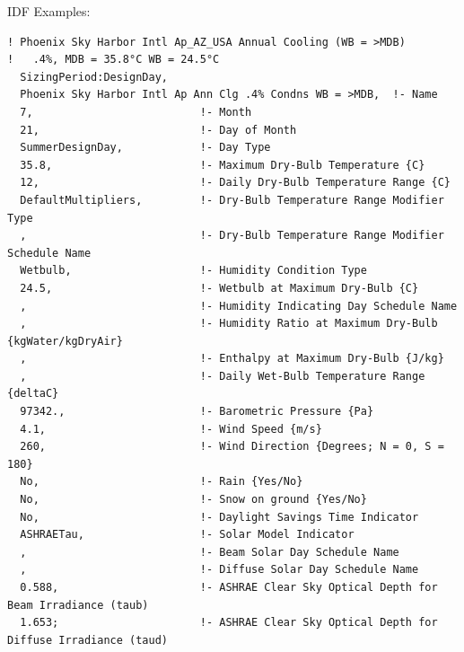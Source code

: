 IDF Examples:

\begin{lstlisting}
! Phoenix Sky Harbor Intl Ap_AZ_USA Annual Cooling (WB = >MDB)
!   .4%, MDB = 35.8°C WB = 24.5°C
  SizingPeriod:DesignDay,
  Phoenix Sky Harbor Intl Ap Ann Clg .4% Condns WB = >MDB,  !- Name
  7,                          !- Month
  21,                         !- Day of Month
  SummerDesignDay,            !- Day Type
  35.8,                       !- Maximum Dry-Bulb Temperature {C}
  12,                         !- Daily Dry-Bulb Temperature Range {C}
  DefaultMultipliers,         !- Dry-Bulb Temperature Range Modifier Type
  ,                           !- Dry-Bulb Temperature Range Modifier Schedule Name
  Wetbulb,                    !- Humidity Condition Type
  24.5,                       !- Wetbulb at Maximum Dry-Bulb {C}
  ,                           !- Humidity Indicating Day Schedule Name
  ,                           !- Humidity Ratio at Maximum Dry-Bulb {kgWater/kgDryAir}
  ,                           !- Enthalpy at Maximum Dry-Bulb {J/kg}
  ,                           !- Daily Wet-Bulb Temperature Range {deltaC}
  97342.,                     !- Barometric Pressure {Pa}
  4.1,                        !- Wind Speed {m/s}
  260,                        !- Wind Direction {Degrees; N = 0, S = 180}
  No,                         !- Rain {Yes/No}
  No,                         !- Snow on ground {Yes/No}
  No,                         !- Daylight Savings Time Indicator
  ASHRAETau,                  !- Solar Model Indicator
  ,                           !- Beam Solar Day Schedule Name
  ,                           !- Diffuse Solar Day Schedule Name
  0.588,                      !- ASHRAE Clear Sky Optical Depth for Beam Irradiance (taub)
  1.653;                      !- ASHRAE Clear Sky Optical Depth for Diffuse Irradiance (taud)


\end{lstlisting}
